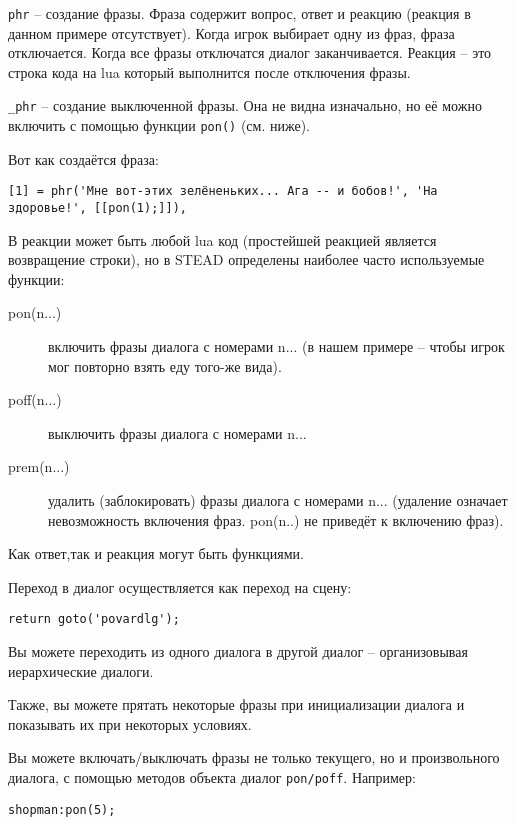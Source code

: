 \documentclass[a4paper,12pt]{article}
\begin{document}
\verb/phr/ -- создание фразы. Фраза содержит вопрос, ответ и реакцию (реакция в данном примере отсутствует). Когда игрок выбирает одну из фраз, фраза отключается. Когда все фразы отключатся диалог заканчивается. Реакция -- это строка кода на lua который выполнится после отключения фразы. 

\verb/_phr/ -- создание выключенной фразы. Она не видна изначально, но её можно включить с помощью функции \verb/pon()/ (см. ниже).

Вот как создаётся фраза:

\begin{verbatim}
[1] = phr('Мне вот-этих зелёненьких... Ага -- и бобов!', 'На здоровье!', [[pon(1);]]),
\end{verbatim}

В реакции может быть любой lua код (простейшей реакцией является возвращение строки), но в STEAD определены наиболее часто используемые функции:

\begin{description}
\item[pon(n...)] включить фразы диалога с номерами n... (в нашем примере -- чтобы игрок мог повторно взять еду того-же вида).
\item[poff(n...)] выключить фразы диалога с номерами n...
\item[prem(n...)] удалить (заблокировать) фразы диалога с номерами n... (удаление означает невозможность включения фраз. pon(n..) не приведёт к включению фраз).
\end{description}

Как ответ,так и реакция могут быть функциями.

Переход в диалог осуществляется как переход на сцену:

\begin{verbatim}
return goto('povardlg');
\end{verbatim}

Вы можете переходить из одного диалога в другой диалог -- организовывая иерархические диалоги.

Также, вы можете прятать некоторые фразы при инициализации диалога и показывать их при некоторых условиях.

Вы можете включать/выключать фразы не только текущего, но и произвольного диалога, с помощью методов объекта диалог \verb,pon/poff,. Например:

\begin{verbatim}
shopman:pon(5);
\end{verbatim}
\end{document}
